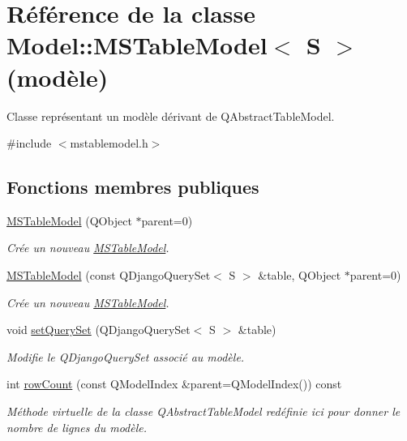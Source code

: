 \hypertarget{class_model_1_1_m_s_table_model}{
\section{Référence de la classe Model::MSTableModel$<$ S $>$ (modèle)}
\label{dd/df1/class_model_1_1_m_s_table_model}
}


Classe représentant un modèle dérivant de QAbstractTableModel.  




{\ttfamily \#include $<$mstablemodel.h$>$}

\subsection*{Fonctions membres publiques}
\begin{DoxyCompactItemize}
\item 
\hyperlink{class_model_1_1_m_s_table_model_a30e231f29210374f874984eeb6e0747b}{MSTableModel} (QObject $\ast$parent=0)
\begin{DoxyCompactList}\small\item\em Crée un nouveau \hyperlink{class_model_1_1_m_s_table_model}{MSTableModel}. \item\end{DoxyCompactList}\item 
\hyperlink{class_model_1_1_m_s_table_model_aa33f0d847cdd4bcdf2a3733b1bf74a74}{MSTableModel} (const QDjangoQuerySet$<$ S $>$ \&table, QObject $\ast$parent=0)
\begin{DoxyCompactList}\small\item\em Crée un nouveau \hyperlink{class_model_1_1_m_s_table_model}{MSTableModel}. \item\end{DoxyCompactList}\item 
void \hyperlink{class_model_1_1_m_s_table_model_abde72a77c23d0a8dd452c7e8fe67bb37}{setQuerySet} (QDjangoQuerySet$<$ S $>$ \&table)
\begin{DoxyCompactList}\small\item\em Modifie le QDjangoQuerySet associé au modèle. \item\end{DoxyCompactList}\item 
int \hyperlink{class_model_1_1_m_s_table_model_afed4398e4a30645b9105683ff4f5ee80}{rowCount} (const QModelIndex \&parent=QModelIndex()) const 
\begin{DoxyCompactList}\small\item\em Méthode virtuelle de la classe QAbstractTableModel redéfinie ici pour donner le nombre de lignes du modèle. \item\end{DoxyCompactList}\item 

\end{DoxyCompactItemize}
